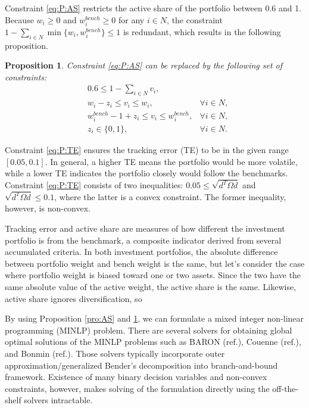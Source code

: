 \documentclass[11pt]{article}
\newtheorem{pro}{Proposition}
\begin{document}
	Constraint \eqref{eq:P:AS} restricts the active share of the portfolio between 0.6 and 1. Because $w_i \ge 0$ and $w^{bench}_i \ge 0$ for any $i \in N$, the constraint $1 - \sum_{i \in N} \min\{w_i, w^{bench}_i \} \le 1$ is redundant, which results in the following proposition.
	\begin{pro}\label{pro:TE}
		Constraint \eqref{eq:P:AS} can be replaced by the following set of constraints:
		\begin{align*}
		& 0.6 \le 1 -  \sum_{i \in N} v_i,\\
		& w_i - z_i \le v_i \le w_i, & \forall i \in N,\\
		& w^{bench}_i - 1 + z_i \le v_i \le w^{bench}_i, & \forall i \in N,\\
		& z_i \in \{0,1\}, & \forall i \in N.
		\end{align*}
	\end{pro}
	
	Constraint \eqref{eq:P:TE} ensures the tracking error (TE) to be in the given range $[0.05,0.1]$. In general, a higher TE means the portfolio would be more volatile, while a lower TE indicates the portfolio closely would follow the benchmarks. Constraint \eqref{eq:P:TE} consists of two inequalities: $0.05 \le \sqrt{d^T \Omega d}$ and $\sqrt{d^T \Omega d} \le 0.1$, where the latter is a convex constraint. The former inequality, however, is non-convex. 
	
   Tracking error and active share are measures of how different the investment portfolio is from the benchmark, a composite indicator derived from several accumulated criteria. In both investment portfolios, the absolute difference between portfolio weight and bench weight is the same, but let's consider the case where portfolio weight is biased toward one or two assets. Since the two have the same absolute value of the active weight, the active share is the same. Likewise, active share ignores diversification, so 
   
	
	
	By using Proposition \ref{pro:AS} and \ref{pro:TE}, we can formulate a mixed integer non-linear programming (MINLP) problem. There are several solvers for obtaining global optimal solutions of the MINLP problems such as BARON (ref.), Couenne (ref.), and Bonmin (ref.). Those solvers typically incorporate outer approximation/generalized Bender's decomposition into branch-and-bound framework. Existence of many binary decision variables and non-convex constraints, however, makes solving of the formulation directly using the off-the-shelf solvers intractable. 
	
\end{document}
